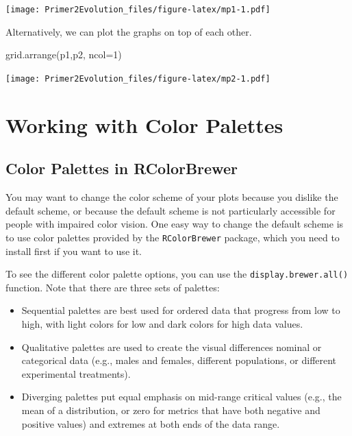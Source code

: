 \documentclass[
]{book}
\newenvironment{Shaded}{\begin{snugshade}}{\end{snugshade}}
\newcommand{\AttributeTok}[1]{\textcolor[rgb]{0.77,0.63,0.00}{#1}}
\newcommand{\DecValTok}[1]{\textcolor[rgb]{0.00,0.00,0.81}{#1}}
\newcommand{\FunctionTok}[1]{\textcolor[rgb]{0.00,0.00,0.00}{#1}}
\newcommand{\NormalTok}[1]{#1}
\begin{document}
\texttt{[image: Primer2Evolution\_files/figure-latex/mp1-1.pdf]}

Alternatively, we can plot the graphs on top of each other.

\begin{Shaded}
\begin{Highlighting}[]
\FunctionTok{grid.arrange}\NormalTok{(p1,p2, }\AttributeTok{ncol=}\DecValTok{1}\NormalTok{)}
\end{Highlighting}
\end{Shaded}

\texttt{[image: Primer2Evolution\_files/figure-latex/mp2-1.pdf]}

\hypertarget{working-with-color-palettes}{%
\section{Working with Color Palettes}\label{working-with-color-palettes}}

\hypertarget{color-palettes-in-rcolorbrewer}{%
\subsection{Color Palettes in RColorBrewer}\label{color-palettes-in-rcolorbrewer}}

You may want to change the color scheme of your plots because you dislike the default scheme, or because the default scheme is not particularly accessible for people with impaired color vision. One easy way to change the default scheme is to use color palettes provided by the \texttt{RColorBrewer} package, which you need to install first if you want to use it.

To see the different color palette options, you can use the \texttt{display.brewer.all()} function. Note that there are three sets of palettes:

\begin{itemize}
\item
  Sequential palettes are best used for ordered data that progress from low to high, with light colors for low and dark colors for high data values.
\item
  Qualitative palettes are used to create the visual differences nominal or categorical data (e.g., males and females, different populations, or different experimental treatments).
\item
  Diverging palettes put equal emphasis on mid-range critical values (e.g., the mean of a distribution, or zero for metrics that have both negative and positive values) and extremes at both ends of the data range.
\end{itemize}
\end{document}
